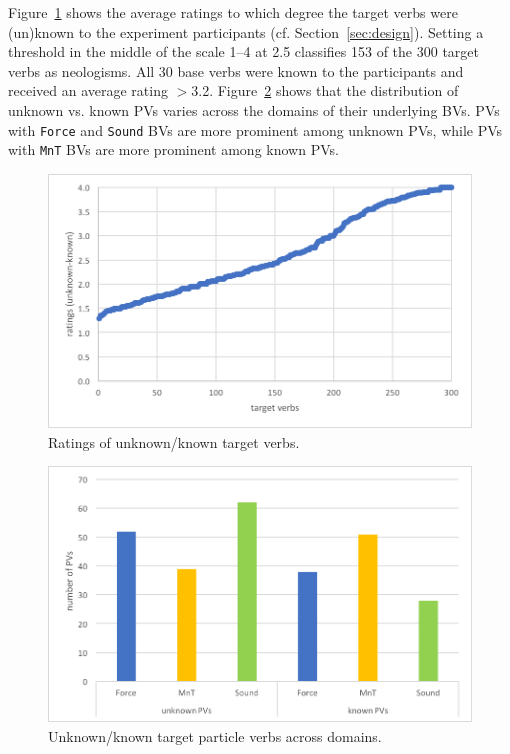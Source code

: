 \documentclass[output=paper]{langsci/langscibook}
\begin{document}
Figure~\ref{fig:neo-ratings} shows the average ratings to which degree
the target verbs were (un)known to the experiment participants
(cf. Section~\ref{sec:design}). Setting a threshold in the middle of
the scale 1--4 at 2.5 classifies 153 of the 300 target verbs as
neologisms. All 30 base verbs were known to the participants and
received an average rating $>$3.2.
Figure~\ref{fig:neo-ratings-domain} shows that the distribution of
unknown vs. known PVs varies across the domains of their underlying
BVs. PVs with \texttt{Force} and \texttt{Sound} BVs are more prominent
among unknown PVs, while PVs with \texttt{MnT} BVs are more prominent
among known PVs.

\begin{figure}[p]
  \caption{Ratings of unknown/known target verbs.}
  \label{fig:neo-ratings}
  \includegraphics[width=.9\linewidth]{figures/dataset_neo_ratings.png}
\end{figure}

\begin{figure}[p]
  \caption{Unknown/known target particle verbs across domains.}
  \label{fig:neo-ratings-domain}
  \includegraphics[width=.9\linewidth]{figures/dataset_neo_domain_ratings.png}
\end{figure}
\end{document}
